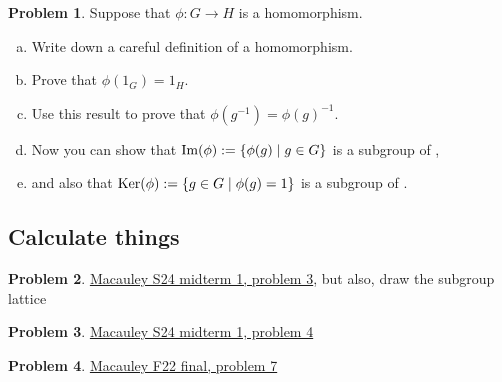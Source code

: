 \documentclass[12pt]{article}
\theoremstyle{definition} %
\newtheorem{problem}{Problem}
\newcommand\inv{^{-1}} %
\begin{document}
\begin{problem}
    Suppose that $\phi:G\to H$ is a homomorphism.
    \begin{enumerate}[(a)]
        \item Write down a careful definition of a homomorphism.
        \item Prove that $\phi(1_G) = 1_H$.
        \item Use this result to prove that $\phi(g\inv) = \phi(g)\inv$.
        \item Now you can show that $\operatorname{Im}(\phi) := \{\phi(g) \mid g\in G\}$ is a subgroup of \underline{\quad},
        \item and also that $\operatorname{Ker}(\phi) := \{g \in G \mid \phi(g) = 1\}$ is a subgroup of \underline{\quad}.
    \end{enumerate}
\end{problem}

\subsection*{Calculate things}

\begin{problem}
    \href{https://www.math.clemson.edu/~macaule/classes/s24_math4120/exams/s24_math4120_midterm1.pdf}{Macauley S24 midterm 1, problem 3}, but also, draw the subgroup lattice
\end{problem}

\begin{problem}
    \href{https://www.math.clemson.edu/~macaule/classes/s24_math4120/exams/s24_math4120_midterm1.pdf}{Macauley S24 midterm 1, problem 4}
\end{problem}

\begin{problem}
    \href{https://www.math.clemson.edu/~macaule/classes/f22_math4120/exams/f22_math4120_finalexam.pdf}{Macauley F22 final, problem 7}
\end{problem}
\end{document}
